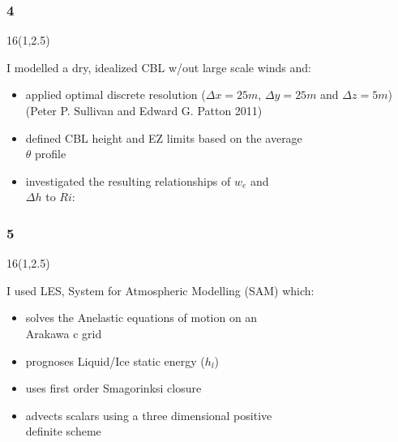 \documentclass{beamer}
\newcommand\FrameText[1]{
\begin{textblock}{16}(1,2.5)
\raggedright #1
\end{textblock}}
\begin{document}
\begin{frame}
\frametitle{4}
\fontsize{12pt}{7.2}\selectfont
\FrameText{I modelled a dry, idealized CBL w/out large scale winds and:
\vspace{10mm}
\begin{itemize}
\item applied optimal discrete resolution ($\Delta x = 25m$, $\Delta y = 25m$ and $\Delta z = 5m$)\\
(Peter P. Sullivan and Edward G. Patton 2011)
\vspace{10mm}  
\item defined CBL height and EZ limits based on the average \\
$\theta$ profile
\vspace{10mm}
\item investigated the resulting relationships of $w_{e}$ and \\
 $\Delta h$ to $Ri$:
\end{itemize}
}
\end{frame}


\begin{frame}
\frametitle{5}
\fontsize{12pt}{7.2}\selectfont
\FrameText{I used LES, System for Atmospheric Modelling (SAM) which:
\vspace{7mm}
\begin{itemize}
\item solves the Anelastic equations of motion on an\\
Arakawa c grid
\vspace{7mm} 
\item prognoses Liquid/Ice static energy ($h_{l}$) 
\vspace{7mm}
\item uses first order Smagorinksi closure
\vspace{7mm}
\item advects scalars using a three dimensional positive\\
definite scheme
\end{itemize}
}
\end{frame}
\end{document}
